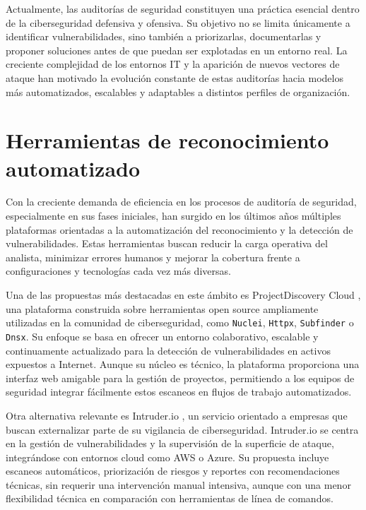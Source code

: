 \begin{parskipenv}
Actualmente, las auditorías de seguridad constituyen una práctica esencial dentro de la ciberseguridad defensiva y ofensiva. Su objetivo no se limita únicamente a identificar vulnerabilidades, sino también a priorizarlas, documentarlas y proponer soluciones antes de que puedan ser explotadas en un entorno real. La creciente complejidad de los entornos IT y la aparición de nuevos vectores de ataque han motivado la evolución constante de estas auditorías hacia modelos más automatizados, escalables y adaptables a distintos perfiles de organización.

\section{Herramientas de reconocimiento automatizado}

Con la creciente demanda de eficiencia en los procesos de auditoría de seguridad, especialmente en sus fases iniciales, han surgido en los últimos años múltiples plataformas orientadas a la automatización del reconocimiento y la detección de vulnerabilidades. Estas herramientas buscan reducir la carga operativa del analista, minimizar errores humanos y mejorar la cobertura frente a configuraciones y tecnologías cada vez más diversas.

Una de las propuestas más destacadas en este ámbito es ProjectDiscovery Cloud \cite{projectdiscovery}, una plataforma construida sobre herramientas open source ampliamente utilizadas en la comunidad de ciberseguridad, como \texttt{Nuclei}, \texttt{Httpx}, \texttt{Subfinder} o \texttt{Dnsx}. Su enfoque se basa en ofrecer un entorno colaborativo, escalable y continuamente actualizado para la detección de vulnerabilidades en activos expuestos a Internet. Aunque su núcleo es técnico, la plataforma proporciona una interfaz web amigable para la gestión de proyectos, permitiendo a los equipos de seguridad integrar fácilmente estos escaneos en flujos de trabajo automatizados.

Otra alternativa relevante es Intruder.io \cite{intruderio}, un servicio orientado a empresas que buscan externalizar parte de su vigilancia de ciberseguridad. Intruder.io se centra en la gestión de vulnerabilidades y la supervisión de la superficie de ataque, integrándose con entornos cloud como AWS o Azure. Su propuesta incluye escaneos automáticos, priorización de riesgos y reportes con recomendaciones técnicas, sin requerir una intervención manual intensiva, aunque con una menor flexibilidad técnica en comparación con herramientas de línea de comandos.


\end{parskipenv}
